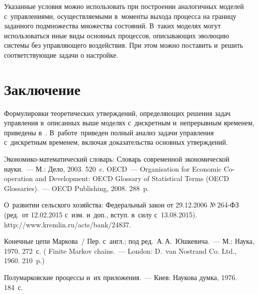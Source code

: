 \begin{multicols}{2}
Указанные условия можно использовать при построении аналогичных моделей 
с~управ\-ле\-ни\-ями, осуществляемыми в~моменты выхода процесса на границу заданного 
подмножества множества состояний. В~таких моделях могут использоваться иные виды 
основных процессов, описывающих эволюцию системы без управляющего воздействия. 
При этом можно поставить и~решить соответствующие задачи о настройке.

\vspace*{-6pt}

\section{Заключение}

\vspace*{-3pt}

Формулировки теоретических утверждений, опре\-де\-ля\-ющих решения задач управления 
в~описанных выше моделях с~дискретным и~непрерывным временем, приведены 
в~\cite{SN1}. В~работе~\cite{SN29}\linebreak приведен полный анализ задачи управления 
с~дискретным временем, включая доказательства основных утверждений.

\vspace*{-12pt}

{\small\frenchspacing
 {%
 \begin{thebibliography}{99}
 Эко\-но\-ми\-ко-ма\-те\-ма\-ти\-че\-ский словарь: 
Словарь современной экономической науки.~--- М.: Дело, 2003. 520~c.
OECD~--- Organisation for Economic Co-operation and Development: 
OECD Glossary of Statistical Terms (OECD Glossaries).~--- OECD Publishing, 2008. 
288~p.

О~развитии сельского хозяйства: Федеральный закон от 29.12.2006 
№\,264-ФЗ (ред.\ от 12.02.2015 с~изм. и~доп., вступ. в~силу 
с~13.08.2015). {\sf http://www.\linebreak kremlin.ru/acts/bank/24837}.

 Конечные цепи Маркова~/ 
Пер. с~англ.; под ред.\ А.\,А.~Юшкевича.~---  М.: Наука, 1970. 272~с.
( 
Finite Markov chains.~--- London: D.~van Nostrand Co. Ltd., 1960. 210~p.)



Полумарковские 
процессы и~их приложения.~--- Киев: Наукова думка, 1976. 184~с.


\end{thebibliography}}}
\end{multicols}
